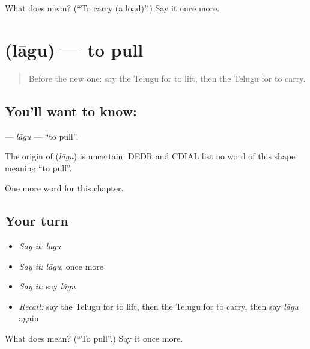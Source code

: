 \begin{tcolorbox}[breakable,colback=teal!4,colframe=teal!35!black,title={Before you move on}]
What does  mean? (\textquotedblleft{}To carry (a load)\textquotedblright{}.) Say it once more.
\end{tcolorbox}
\section[\texorpdfstring{\te{లాగు} (lāgu)}{లాగు (lāgu)}]{ (lāgu) — to pull}

\label{lesson:TE-C240-lagu}



\begin{quote}
Before the new one: say the Telugu for to lift, then the Telugu for to carry.
\end{quote}

\subsection*{You'll want to know: }
\textbf{} — \emph{lāgu} — \textquotedblleft{}to pull\textquotedblright{}.

\begin{cousinweb}
The origin of \textbf{} (\emph{lāgu}) is uncertain. DEDR and CDIAL list no word of this shape meaning \textquotedblleft{}to pull\textquotedblright{}.
\end{cousinweb}

\begin{grammarlens}[title={What you've built}]
One more word for this chapter.
\end{grammarlens}

\subsection*{Your turn}
\begin{itemize}
\raggedright
  \item \emph{Say it:} \emph{lāgu}
  \item \emph{Say it:} \emph{lāgu}, once more
  \item \emph{Say it:} say \emph{lāgu}
  \item \emph{Recall:} say the Telugu for to lift, then the Telugu for to carry, then say \emph{lāgu} again
\end{itemize}

\begin{tcolorbox}[breakable,colback=teal!4,colframe=teal!35!black,title={Before you move on}]
What does  mean? (\textquotedblleft{}To pull\textquotedblright{}.) Say it once more.
\end{tcolorbox}
